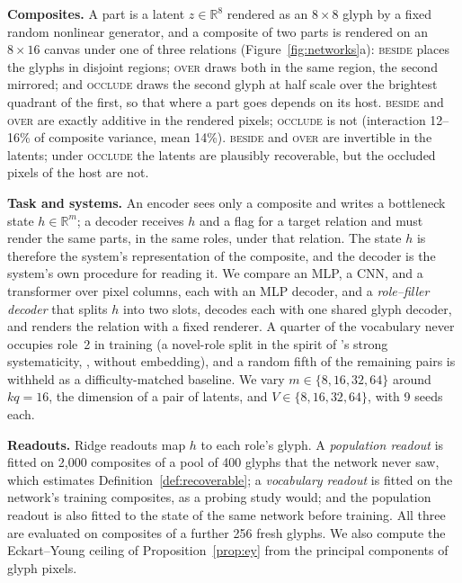 \documentclass[10pt]{article}
\theoremstyle{plain}
\theoremstyle{remark}
\newcommand{\R}{\mathbb{R}}
\begin{document}
\textbf{Composites.} A part is a latent $z \in \R^{8}$ rendered as an $8 \times 8$ glyph by a fixed random nonlinear generator, and a composite of two parts is rendered on an $8 \times 16$ canvas under one of three relations (Figure~\ref{fig:networks}a): \textsc{beside} places the glyphs in disjoint regions; \textsc{over} draws both in the same region, the second mirrored; and \textsc{occlude} draws the second glyph at half scale over the brightest quadrant of the first, so that where a part goes depends on its host. \textsc{beside} and \textsc{over} are exactly additive in the rendered pixels; \textsc{occlude} is not (interaction 12--16\% of composite variance, mean 14\%). \textsc{beside} and \textsc{over} are invertible in the latents; under \textsc{occlude} the latents are plausibly recoverable, but the occluded pixels of the host are not.

\textbf{Task and systems.} An encoder sees only a composite and writes a bottleneck state $h \in \R^m$; a decoder receives $h$ and a flag for a target relation and must render the same parts, in the same roles, under that relation. The state $h$ is therefore the system's representation of the composite, and the decoder is the system's own procedure for reading it. We compare an MLP, a CNN, and a transformer over pixel columns, each with an MLP decoder, and a \emph{role--filler decoder} that splits $h$ into two slots, decodes each with one shared glyph decoder, and renders the relation with a fixed renderer. A quarter of the vocabulary never occupies role~2 in training (a novel-role split in the spirit of \citeauthor{hadley1994}'s strong systematicity, \citeyear{hadley1994}, without embedding), and a random fifth of the remaining pairs is withheld as a difficulty-matched baseline. We vary $m \in \{8, 16, 32, 64\}$ around $kq = 16$, the dimension of a pair of latents, and $V \in \{8, 16, 32, 64\}$, with 9 seeds each.

\textbf{Readouts.} Ridge readouts map $h$ to each role's glyph. A \emph{population readout} is fitted on 2{,}000 composites of a pool of 400 glyphs that the network never saw, which estimates Definition~\ref{def:recoverable}; a \emph{vocabulary readout} is fitted on the network's training composites, as a probing study would; and the population readout is also fitted to the state of the same network before training. All three are evaluated on composites of a further 256 fresh glyphs. We also compute the Eckart--Young ceiling of Proposition~\ref{prop:ey} from the principal components of glyph pixels.
\end{document}
